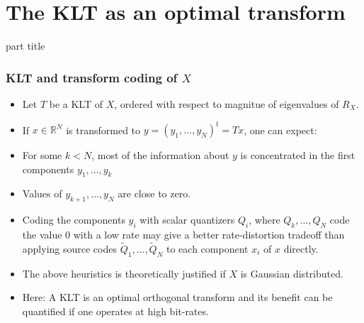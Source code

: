 \section{The KLT as an optimal transform} 
\begin{frame}
 \vspace{12.0ex}
\begin{center}
\begin{beamercolorbox}[sep=12pt,center]{part title}
\insertsection\par
\end{beamercolorbox}
\end{center}
\end{frame}

\begin{frame}\frametitle{KLT and transform coding of $X$}
\begin{itemize} 
\item Let $T$ be a KLT of $X$, ordered with respect to magnitue of eigenvalues of $R_X$. 
\item If $x\in\mathbb{R}^N$ is transformed to $y=(y_1,\dots,y_N)^t=Tx$, one can expect:
\bit 
\item For some $k<N$,  
most of the information about $y$ is concentrated in the first components $y_1,\dots,y_k$ 
\item Values of $y_{k+1},\dots,y_N$ are close to zero.
\eit
\item[\iarrow] Coding the components $y_i$ with scalar quantizers  $Q_i$,  where  
$Q_k,\dots,Q_N$  code the value $0$ with a low rate  may give a better rate-distortion tradeoff 
than applying source codes $\tilde{Q}_1,\dots,\tilde{Q}_N$ to each component $x_i$ of $x$ directly. 
\end{itemize}
\begin{itemize}
\item The above heuristics is theoretically justified if $X$ is Gaussian distributed. 
\item Here: A KLT is an optimal orthogonal transform and its benefit can be quantified  
if one operates at high bit-rates. 
\end{itemize}
\end{frame}

